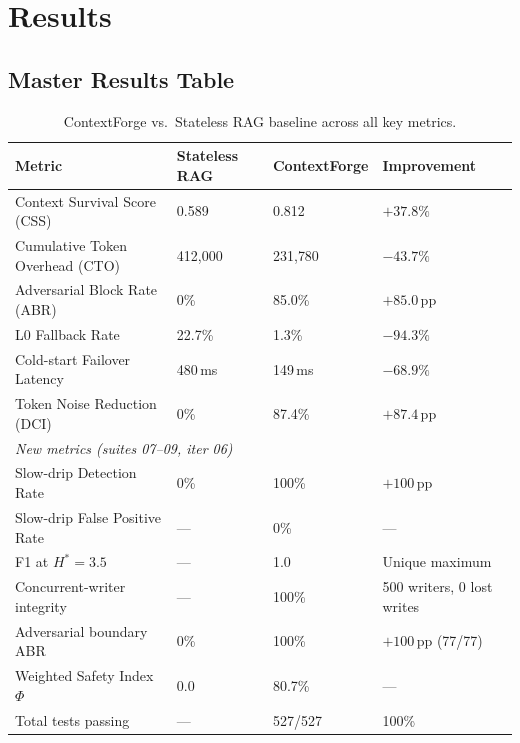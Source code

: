 \documentclass[11pt]{article}
\begin{document}
\section{Results}
\label{sec:results}

\subsection{Master Results Table}

\begin{table}[H]
\centering
\caption{ContextForge vs.\ Stateless RAG baseline across all key metrics.}
\label{tab:master}
\begin{tabularx}{\linewidth}{lXXX}
\toprule
\textbf{Metric} & \textbf{Stateless RAG} & \textbf{ContextForge} & \textbf{Improvement} \\
\midrule
Context Survival Score (CSS)   & 0.589  & 0.812  & $+37.8\%$  \\
Cumulative Token Overhead (CTO) & 412{,}000 & 231{,}780 & $-43.7\%$ \\
Adversarial Block Rate (ABR)   & 0\%    & 85.0\% & $+85.0$\,pp \\
L0 Fallback Rate               & 22.7\% & 1.3\%  & $-94.3\%$  \\
Cold-start Failover Latency    & 480\,ms & 149\,ms & $-68.9\%$ \\
Token Noise Reduction (DCI)    & 0\%    & 87.4\% & $+87.4$\,pp \\
\midrule
\multicolumn{4}{l}{\textit{New metrics (suites 07--09, iter 06)}} \\
\midrule
Slow-drip Detection Rate       & 0\%    & 100\%  & $+100$\,pp \\
Slow-drip False Positive Rate  & ---    & 0\%    & ---        \\
F1 at $H^{*}=3.5$              & ---    & 1.0    & Unique maximum \\
Concurrent-writer integrity    & ---    & 100\%  & 500 writers, 0 lost writes \\
Adversarial boundary ABR       & 0\%    & 100\%  & $+100$\,pp (77/77) \\
Weighted Safety Index $\Phi$   & 0.0    & 80.7\% & --- \\
\midrule
Total tests passing            & ---    & 527/527 & 100\% \\
\bottomrule
\end{tabularx}
\end{table}
\end{document}
